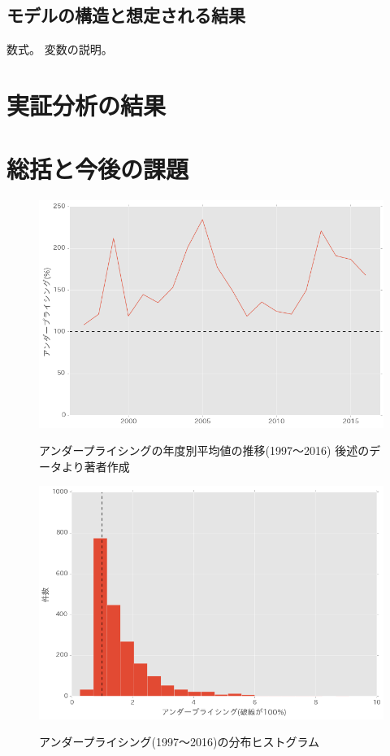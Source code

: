 \documentclass{jsarticle}
\begin{document}
\subsection{モデルの構造と想定される結果}
数式。
変数の説明。

\section{実証分析の結果}
\section{総括と今後の課題}

\newpage

\begin{figure}[p]
  \begin{center}
  \caption{アンダープライシングの年度別平均値の推移(1997〜2016) 後述のデータより著者作成}
    \includegraphics[clip,width=14cm]{./transition.png}
    \label{transition}
  \end{center}
\end{figure}


\begin{figure}[p]
  \begin{center}
  \caption{アンダープライシング(1997〜2016)の分布ヒストグラム}
    \includegraphics[clip,width=14cm]{./hist.png}
    \label{hist}
  \end{center}
\end{figure}
\end{document}
